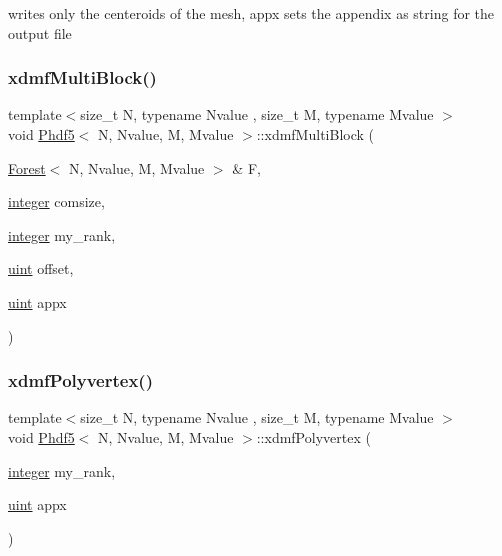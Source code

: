 writes only the centeroids of the mesh, appx sets the appendix as string for the output file \mbox{\label{classPhdf5_a6f869e6df79d216b7746b35869b8d82f}} 
\subsubsection{\texorpdfstring{xdmf\+Multi\+Block()}{xdmfMultiBlock()}}
{\footnotesize\ttfamily template$<$size\+\_\+t N, typename Nvalue , size\+\_\+t M, typename Mvalue $>$ \\
void \mbox{\hyperlink{classPhdf5}{Phdf5}}$<$ N, Nvalue, M, Mvalue $>$\+::xdmf\+Multi\+Block (\begin{DoxyParamCaption}\item[{\mbox{\hyperlink{classForest}{Forest}}$<$ N, Nvalue, M, Mvalue $>$ \&}]{F,  }\item[{\mbox{\hyperlink{definitions_8h_adbd822dbdb8152553a0f77b84915bd8d}{integer}}}]{comsize,  }\item[{\mbox{\hyperlink{definitions_8h_adbd822dbdb8152553a0f77b84915bd8d}{integer}}}]{my\+\_\+rank,  }\item[{\mbox{\hyperlink{definitions_8h_a69aa29b598b851b0640aa225a9e5d61d}{uint}}}]{offset,  }\item[{\mbox{\hyperlink{definitions_8h_a69aa29b598b851b0640aa225a9e5d61d}{uint}}}]{appx }\end{DoxyParamCaption})}

\mbox{\label{classPhdf5_afb34f940fb0ca36971a73a09800c388a}} 
\subsubsection{\texorpdfstring{xdmf\+Polyvertex()}{xdmfPolyvertex()}}
{\footnotesize\ttfamily template$<$size\+\_\+t N, typename Nvalue , size\+\_\+t M, typename Mvalue $>$ \\
void \mbox{\hyperlink{classPhdf5}{Phdf5}}$<$ N, Nvalue, M, Mvalue $>$\+::xdmf\+Polyvertex (\begin{DoxyParamCaption}\item[{\mbox{\hyperlink{definitions_8h_adbd822dbdb8152553a0f77b84915bd8d}{integer}}}]{my\+\_\+rank,  }\item[{\mbox{\hyperlink{definitions_8h_a69aa29b598b851b0640aa225a9e5d61d}{uint}}}]{appx }\end{DoxyParamCaption})}



